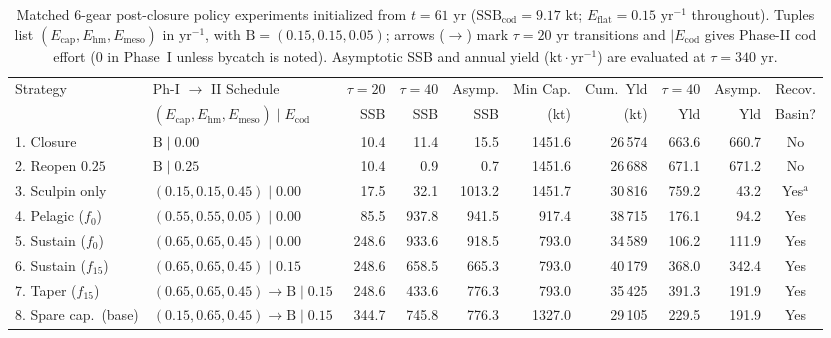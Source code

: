 \documentclass[11pt,letterpaper]{article}
\newcommand{\toprule}{\noalign{\hrule height 0.85pt\vspace{2.5pt}}}
\newcommand{\midrule}{\noalign{\vspace{2pt}\hrule height 0.45pt\vspace{2.5pt}}}
\begin{document}
\begin{table}[t!]
\centering
\caption{Matched 6-gear post-closure policy experiments initialized from $t = 61\text{ yr}$ ($\mathrm{SSB}_{\mathrm{cod}} = 9.17\text{ kt}$; $E_{\mathrm{flat}} = 0.15\text{ yr}^{-1}$ throughout). Tuples list $(E_{\mathrm{cap}}, E_{\mathrm{hm}}, E_{\mathrm{meso}})$ in $\text{yr}^{-1}$, with $\mathrm{B} = (0.15, 0.15, 0.05)$; arrows ($\to$) mark $\tau = 20\text{ yr}$ transitions and $|E_{\mathrm{cod}}$ gives Phase-II cod effort ($0$ in Phase~I unless bycatch is noted). Asymptotic SSB and annual yield ($\text{kt}\cdot\text{yr}^{-1}$) are evaluated at $\tau = 340\text{ yr}$.}
\label{tab:policies}
\vspace{0.3em}
{\footnotesize
\setlength{\tabcolsep}{1.9pt}
\begin{tabular}{@{}llrrrrrrrc@{}}
\toprule
Strategy & Ph-I $\to$ II Schedule & $\tau=20$ & $\tau=40$ & Asymp. & Min Cap. & Cum.\ Yld & $\tau=40$ & Asymp. & Recov. \\
         & $(E_{\mathrm{cap}}, E_{\mathrm{hm}}, E_{\mathrm{meso}}) \mid E_{\mathrm{cod}}$ & SSB & SSB & SSB & (kt) & (kt) & Yld & Yld & Basin? \\
\midrule
1. Closure           & $\mathrm{B} \mid 0.00$                       &  10.4 &  11.4 &   15.5 & 1451.6 & 26\,574 & 663.6 & 660.7 & No \\
2. Reopen $0.25$     & $\mathrm{B} \mid 0.25$                       &  10.4 &   0.9 &    0.7 & 1451.6 & 26\,688 & 671.1 & 671.2 & No \\
3. Sculpin only      & $(0.15,0.15,0.45) \mid 0.00$                 &  17.5 &  32.1 & 1013.2 & 1451.7 & 30\,816 & 759.2 &  43.2 & Yes$^{\mathrm{a}}$ \\
4. Pelagic ($f_0$)   & $(0.55,0.55,0.05) \mid 0.00$                 &  85.5 & 937.8 &  941.5 &  917.4 & 38\,715 & 176.1 &  94.2 & Yes \\
5. Sustain ($f_0$)   & $(0.65,0.65,0.45) \mid 0.00$                 & 248.6 & 933.6 &  918.5 &  793.0 & 34\,589 & 106.2 & 111.9 & Yes \\
6. Sustain ($f_{15}$)& $(0.65,0.65,0.45) \mid 0.15$                 & 248.6 & 658.5 &  665.3 &  793.0 & 40\,179 & 368.0 & 342.4 & Yes \\
7. Taper ($f_{15}$)  & $(0.65,0.65,0.45)\!\to\!\mathrm{B}\mid 0.15$ & 248.6 & 433.6 &  776.3 &  793.0 & 35\,425 & 391.3 & 191.9 & Yes \\
8. Spare cap.\ (base)& $(0.15,0.65,0.45)\!\to\!\mathrm{B}\mid 0.15$ & 344.7 & 745.8 &  776.3 & 1327.0 & 29\,105 & 229.5 & 191.9 & Yes \\

\end{tabular}}
\end{table}
\end{document}

